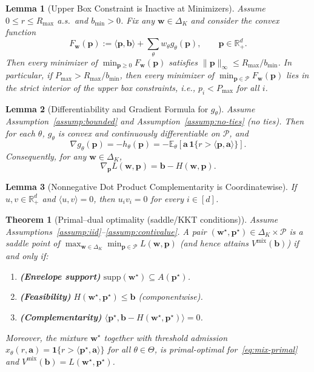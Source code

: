 \documentclass[10pt,a4paper]{amsart}
\newtheorem{theorem}{Theorem}
\newtheorem{lemma}{Lemma}
\newcommand{\E}{\mathbb{E}}
\newcommand{\R}{\mathbb{R}}
\newcommand{\ba}{\mathbf{a}}
\newcommand{\bb}{\mathbf{b}}
\newcommand{\bp}{\mathbf{p}}
\newcommand{\bw}{\mathbf{w}}
\newcommand{\cP}{\mathcal{P}}
\begin{document}
\begin{lemma}[Upper Box Constraint is Inactive at Minimizers]
\label{lem:upper-box-inactive}
Assume $0 \le r \le R_{\max}$ a.s.\ and $b_{\min} > 0$. Fix any $\bw \in \Delta_K$ and consider the convex function
\[
F_{\bw}(\bp) := \langle \bp, \bb \rangle + \sum_{\theta} w_\theta g_\theta(\bp), \qquad \bp \in \R_+^d.
\]
Then every minimizer of $\min_{\bp \ge 0} F_{\bw}(\bp)$ satisfies $\|\bp\|_\infty \le R_{\max}/b_{\min}$.
In particular, if $P_{\max} > R_{\max}/b_{\min}$, then every minimizer of $\min_{\bp \in \cP} F_{\bw}(\bp)$ lies in the strict interior of the upper box constraints, i.e., $p_i < P_{\max}$ for all $i$.
\end{lemma}

\begin{lemma}[Differentiability and Gradient Formula for $g_\theta$]
\label{lem:grad-g-pop}
Assume Assumption~\ref{assump:bounded} and Assumption~\ref{assump:no-ties} (no ties).
Then for each $\theta$, $g_\theta$ is convex and continuously differentiable on $\cP$, and
\[
\nabla g_\theta(\bp) = -h_\theta(\bp) = -\E_\theta\!\left[\ba \, \mathbf{1}\{r > \langle \bp, \ba \rangle\}\right].
\]
Consequently, for any $\bw \in \Delta_K$,
\[
\nabla_{\bp} L(\bw, \bp) = \bb - H(\bw, \bp).
\]
\end{lemma}

\begin{lemma}[Nonnegative Dot Product Complementarity is Coordinatewise]
\label{lem:coordwise-complementarity}
If $u, v \in \R_+^d$ and $\langle u, v \rangle = 0$, then $u_i v_i = 0$ for every $i \in [d]$.
\end{lemma}

\begin{theorem}[Primal--dual optimality (saddle/KKT conditions)]
\label{thm:pd_equilibrium}
Assume Assumptions~\ref{assump:iid}--\ref{assump:contivalue}.
A pair $(\bw^\star,\bp^\star)\in\Delta_K\times\cP$ is a saddle point of $\max_{\bw \in \Delta_K} \min_{\bp \in \cP}L(\bw,\bp)$
(and hence attains $V^{\mathrm{mix}}(\bb)$) if and only if:
\begin{enumerate}[label=(\roman*),leftmargin=*,noitemsep]
\item \textbf{(Envelope support)} $\mathrm{supp}(\bw^\star)\subseteq A(\bp^\star)$.
\item \textbf{(Feasibility)} $H(\bw^\star,\bp^\star)\le \bb$ (componentwise).
\item \textbf{(Complementarity)} $\langle \bp^\star,\bb-H(\bw^\star,\bp^\star)\rangle=0$.
\end{enumerate}
Moreover, the mixture $\bw^\star$ together with threshold admission $x_{\theta}(r,\ba)=\mathbf{1}\{r>\langle \bp^\star,\ba\rangle\}$ for all $\theta\in\Theta$,
 is primal-optimal for~\eqref{eq:mix-primal} and
$V^{\mathrm{mix}}(\bb)=L(\bw^\star,\bp^\star)$.
\end{theorem}
\end{document}

